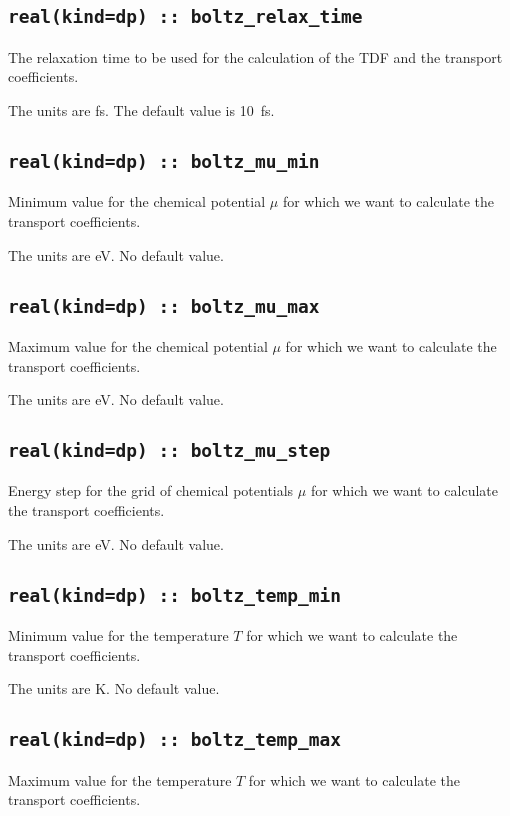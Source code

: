 \subsection[boltz\_relax\_time]{\tt real(kind=dp) :: boltz\_relax\_time}
The relaxation time to be used for the calculation of the TDF and the transport coefficients.

The units are fs.
The default value is 10~fs.

\subsection[boltz\_mu\_min]{\tt real(kind=dp) :: boltz\_mu\_min}
Minimum value for the chemical potential $\mu$ for which we want to calculate the transport coefficients.

The units are eV.
No default value.

\subsection[boltz\_mu\_max]{\tt real(kind=dp) :: boltz\_mu\_max}
Maximum value for the chemical potential $\mu$ for which we want to calculate the transport coefficients.

The units are eV.
No default value.

\subsection[boltz\_mu\_step]{\tt real(kind=dp) :: boltz\_mu\_step}
Energy step for the grid of chemical potentials $\mu$ for which we want to calculate the transport coefficients.

The units are eV.
No default value.

\subsection[boltz\_temp\_min]{\tt real(kind=dp) :: boltz\_temp\_min}
Minimum value for the temperature $T$ for which we want to calculate the transport coefficients.

The units are K.
No default value.

\subsection[boltz\_temp\_max]{\tt real(kind=dp) :: boltz\_temp\_max}
Maximum value for the temperature $T$ for which we want to calculate the transport coefficients.

